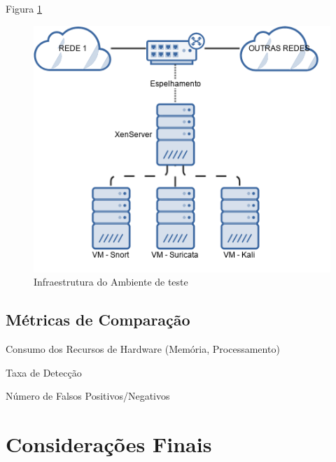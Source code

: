 \documentclass[
	12pt,				%
	openright,			%
	twoside,			%
	a4paper,			%
	english,			%
	brazil				%
	]{abntex2}
\begin{document}
Figura \ref{infra-ambiente}

\begin{figure}
 \centering 
 \includegraphics[scale=.7]{infra.png}
 \caption{Infraestrutura do Ambiente de teste}
 \label{infra-ambiente}
\end{figure}

\section{Métricas de Comparação}
Consumo dos Recursos de Hardware (Memória, Processamento)

Taxa de Detecção

Número de Falsos Positivos/Negativos
\chapter{Considerações Finais}

%

\end{document}
